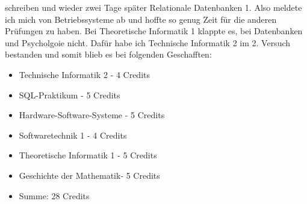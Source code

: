 schreiben und wieder zwei Tage später Relationale Datenbanken 1. Also
meldete ich mich von Betriebssysteme ab und hoffte so genug Zeit für
die anderen Prüfungen zu haben. Bei Theoretische Informatik 1 klappte
es, bei Datenbanken und Psycholgoie nicht. Dafür habe ich Technische Informatik 2 im
2. Versuch bestanden und somit blieb es bei folgenden Geschafften:
\begin{itemize}
\item Technische Informatik 2 - 4 Credits
\item SQL-Praktikum - 5 Credits
\item Hardware-Software-Systeme - 5 Credits
\item Softwaretechnik 1 - 4 Credits
\item Theoretische Informatik 1 - 5 Credits
\item Geschichte der Mathematik- 5 Credits
\item Summe: 28 Credits
\end{itemize}

